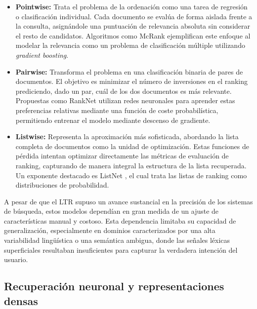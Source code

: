 \begin{itemize}
    \item \textbf{Pointwise:} Trata el problema de la ordenación como una tarea de regresión o clasificación individual. Cada documento se evalúa de forma aislada frente a la consulta, asignándole una puntuación de relevancia absoluta sin considerar el resto de candidatos. Algoritmos como McRank \cite{li2007mcrank} ejemplifican este enfoque al modelar la relevancia como un problema de clasificación múltiple utilizando \textit{gradient boosting}.%
          
    \item \textbf{Pairwise:} Transforma el problema en una clasificación binaria de pares de documentos. El objetivo es minimizar el número de inversiones en el ranking prediciendo, dado un par, cuál de los dos documentos es más relevante. Propuestas como RankNet \cite{burges2005learning} utilizan redes neuronales para aprender estas preferencias relativas mediante una función de coste probabilística, permitiendo entrenar el modelo mediante descenso de gradiente. %
          
    \item \textbf{Listwise:} Representa la aproximación más sofisticada, abordando la lista completa de documentos como la unidad de optimización. Estas funciones de pérdida intentan optimizar directamente las métricas de evaluación de ranking, capturando de manera integral la estructura de la lista recuperada. Un exponente destacado es ListNet \cite{cao2007learning}, el cual trata las listas de ranking como distribuciones de probabilidad.
\end{itemize}

A pesar de que el \gls{LTR} supuso un avance sustancial en la precisión de los sistemas de búsqueda, estos modelos dependían en gran medida de un ajuste de características manual y costoso. Esta dependencia limitaba su capacidad de generalización, especialmente en dominios caracterizados por una alta variabilidad lingüística o una semántica ambigua, donde las señales léxicas superficiales resultaban insuficientes para capturar la verdadera intención del usuario.

\subsection{Recuperación neuronal y representaciones densas}

